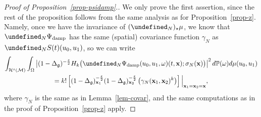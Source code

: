 \documentclass[10pt]{amsart}
\theoremstyle{definition}\newtheorem{defi}[theo]{Definition}\newtheorem{rema}[theo]{Remark}\newtheorem{exam}[theo]{Example}\newtheorem{exem}[theo]{Example}\newtheorem{nota}[theo]{Notation}
\newcommand{\damp}{\textup{damp}}
\newcommand{\Prob}{\mathbb{P}}
\let\P= \undefined
\newcommand{\P}{\mathbf{P}}
\newcommand{\x}{\mathbf{x}}
\newcommand{\M}{\mathcal{M}}
\renewcommand{\H}{\mathcal{H}}
\newcommand{\g}{\mathfrak{g}}
\newcommand{\Dlg}{\Delta_{\g}}
\newcommand{\eps}{\varepsilon}
\newcommand{\s}{\sigma}
\renewcommand{\o}{\omega}
\renewcommand{\O}{\Omega}
\begin{document}
\begin{proof}[Proof of Proposition~\ref{prop-psidamp}.]
We only prove the first assertion, since the rest of the proposition follows from the same analysis as for Proposition~\ref{prop-z}. Namely, once we have the invariance of $(\P_N)_{\star}\mu$, we know that $\P_N\Psi_{\damp}$ has the same (spatial) covariance function $\gamma_N$ as $\P_NS(t)(u_0,u_1)$, so we can write
\begin{multline*}
\int_{\H^s(\M)}\int_\O\left|(1-\Dlg)^{-\frac\eps2}H_k\big(\P_N\Psi_{\damp}(u_0,u_1,\o)(t,\x);\s_N(\x)\big)\right|^2d\Prob(\o) d\mu(u_0,u_1)\\
 =k!\left[(1-\Dlg)_{\x_1}^{-\frac\eps2}(1-\Dlg)_{\x_2}^{-\frac\eps2}\left(\gamma_N(\x_1,\x_2)^k\right)\right]\Big|_{\x_1=\x_2=\x},
\end{multline*}
where $\gamma_N$ is the same as in Lemma~\ref{lem-covar}, and the same computations as in the proof of Proposition~\ref{prop-z} apply.


\end{proof}
\end{document}
